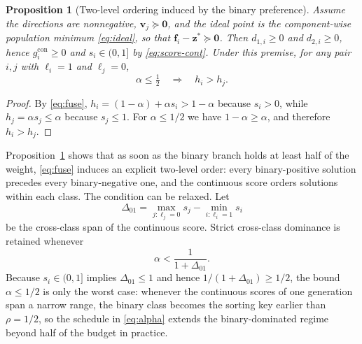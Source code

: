 \documentclass[11pt,a4paper]{article}
\newtheorem{proposition}{Proposition}
\newcommand{\vf}{\mathbf{f}}
\newcommand{\vv}{\mathbf{v}}
\newcommand{\vz}{\mathbf{z}}
\begin{document}
\begin{proposition}[Two-level ordering induced by the binary preference]
\label{prop:twolevel}
Assume the directions are nonnegative, $\vv_j\succeq\bm{0}$, and the ideal point
is the component-wise population minimum \eqref{eq:ideal}, so that
$\vf_i-\vz^{*}\succeq\bm{0}$. Then $d_{1,i}\geq0$ and $d_{2,i}\geq0$, hence
$g_i^{\mathrm{con}}\geq0$ and $s_i\in(0,1]$ by \eqref{eq:score-cont}. Under
this premise, for any pair $i,j$ with $\ell_i=1$ and $\ell_j=0$,
\begin{equation*}
\alpha\leq\tfrac{1}{2}
\quad\Longrightarrow\quad
h_i>h_j .
\end{equation*}
\end{proposition}

\begin{proof}
By \eqref{eq:fuse}, $h_i=(1-\alpha)+\alpha s_i>1-\alpha$ because $s_i>0$, while
$h_j=\alpha s_j\leq\alpha$ because $s_j\leq1$. For $\alpha\leq1/2$ we have
$1-\alpha\geq\alpha$, and therefore $h_i>h_j$.
\end{proof}

Proposition~\ref{prop:twolevel} shows that as soon as the binary branch holds at
least half of the weight, \eqref{eq:fuse} induces an explicit two-level order:
every binary-positive solution precedes every binary-negative one, and the
continuous score orders solutions within each class. The condition can be
relaxed. Let
\begin{equation}
\Delta_{01}=\max_{j:\ell_j=0}s_j-\min_{i:\ell_i=1}s_i
\label{eq:delta01}
\end{equation}
be the cross-class span of the continuous score. Strict cross-class dominance is
retained whenever
\begin{equation}
\alpha<\frac{1}{1+\Delta_{01}} .
\label{eq:relaxed}
\end{equation}
Because $s_i\in(0,1]$ implies $\Delta_{01}\leq1$ and hence
$1/(1+\Delta_{01})\geq1/2$, the bound $\alpha\leq1/2$ is only the worst case:
whenever the continuous scores of one generation span a narrow range, the binary
class becomes the sorting key earlier than $\rho=1/2$, so the schedule in
\eqref{eq:alpha} extends the binary-dominated regime beyond half of the budget
in practice.
\end{document}
